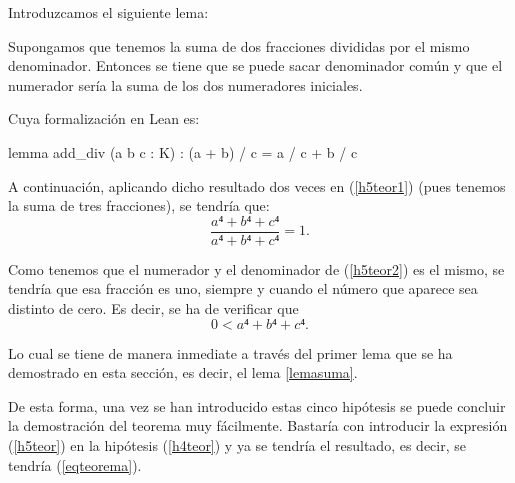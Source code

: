 \begin{demostracion}
\begin{itemize}
    Introduzcamos el siguiente lema:
    \begin{lema}
      Supongamos que tenemos la suma de dos fracciones divididas por el
      mismo denominador. Entonces se tiene que se puede sacar denominador
      común y que el numerador sería la suma de los dos numeradores
      iniciales.
    \end{lema}

    Cuya formalización en Lean es:
    \begin{leancode}
    lemma add_div (a b c : K) : (a + b) / c = a / c + b / c 
    \end{leancode}

    A continuación, aplicando dicho resultado dos veces en (\ref{h5teor1})
    (pues tenemos la suma de tres fracciones), se tendría que:
    \begin{equation}\label{h5teor2}
      \frac{a⁴+b⁴+c⁴}{a⁴+b⁴+c⁴}=1.
    \end{equation}

    Como tenemos que el numerador y el denominador de (\ref{h5teor2}) es
    el mismo, se tendría que esa fracción es uno, siempre y cuando el
    número que aparece sea distinto de cero. Es decir, se ha de verificar
    que
    \begin{equation}
      0<a⁴+b⁴+c⁴.
    \end{equation}

    Lo cual se tiene de manera inmediate a través del primer lema que
    se ha demostrado en esta sección, es decir, el lema \ref{lemasuma}.
  \end{itemize}

  De esta forma, una vez se han introducido estas cinco hipótesis se puede
  concluir la demostración del teorema muy fácilmente. Bastaría con
  introducir la expresión (\ref{h5teor}) en la hipótesis (\ref{h4teor})
  y ya se tendría el resultado, es decir, se tendría (\ref{eqteorema}).
\end{demostracion}

